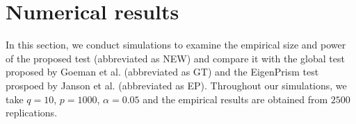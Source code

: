 \documentclass[bj]{imsart}
\theoremstyle{plain}
\theoremstyle{definition}
\theoremstyle{remark}
\begin{document}




\section{Numerical results}\label{sec:Numerical}

In this section, we conduct simulations to examine the empirical size and power of the proposed test
(abbreviated as NEW) 
and compare it with the global test proposed by Goeman {\rm et al.} \cite{Goeman2006} (abbreviated as GT) and the EigenPrism test prospoed by  Janson {\rm et al.} \cite{Janson2016} (abbreviated as EP).
Throughout our simulations, we take $q=10$, $p=1000$, $\alpha=0.05$ and the empirical results are obtained from $2500$ replications.
\end{document}

